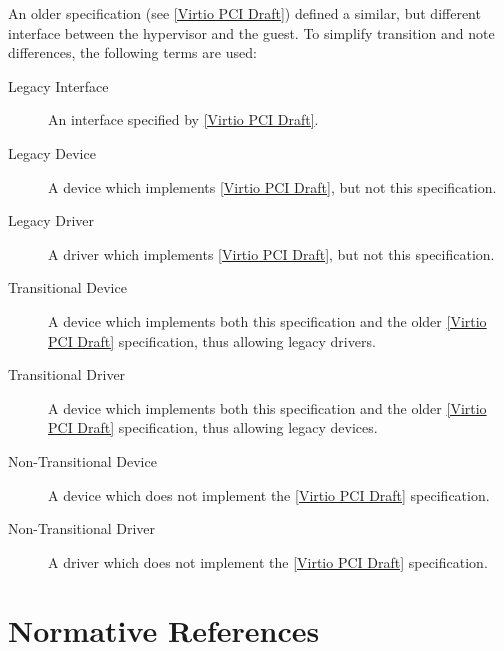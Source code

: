 An older specification (see \hyperref[intro:Virtio PCI Draft]{[Virtio PCI Draft]}) defined a
similar, but different interface between the hypervisor and the guest.
To simplify transition and note differences, the following terms are used:

\begin{description}
\item[Legacy Interface]
        An interface specified by \hyperref[intro:Virtio PCI Draft]{[Virtio PCI Draft]}.
\item[Legacy Device]
        A device which implements \hyperref[intro:Virtio PCI Draft]{[Virtio PCI Draft]}, but not this specification.
\item[Legacy Driver]
        A driver which implements \hyperref[intro:Virtio PCI Draft]{[Virtio PCI Draft]}, but not this specification. 
\item[Transitional Device]
        A device which implements both this specification and the older
        \hyperref[intro:Virtio PCI Draft]{[Virtio PCI Draft]}
        specification, thus allowing legacy drivers.
\item[Transitional Driver]
        A device which implements both this specification and the older
        \hyperref[intro:Virtio PCI Draft]{[Virtio PCI Draft]}
        specification, thus allowing legacy devices.
\item[Non-Transitional Device]
        A device which does not implement the
        \hyperref[intro:Virtio PCI Draft]{[Virtio PCI Draft]} specification.
\item[Non-Transitional Driver]
        A driver which does not implement the
        \hyperref[intro:Virtio PCI Draft]{[Virtio PCI Draft]} specification.
\end{description}

\section{Normative References}

